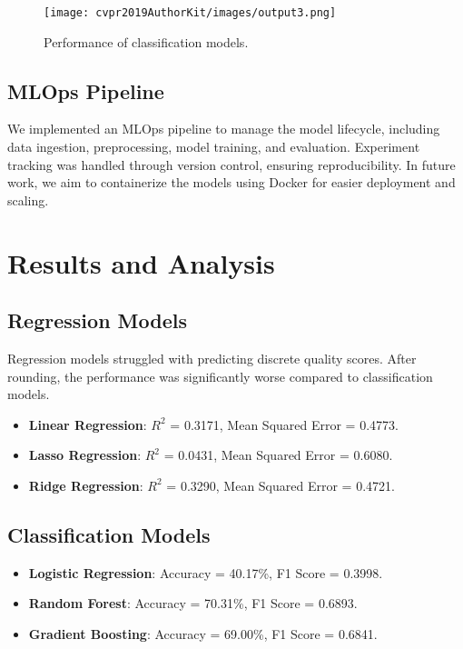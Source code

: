 \documentclass[10pt,twocolumn,letterpaper]{article}
\begin{document}
\begin{figure}[h]
    \centering
    \texttt{[image: cvpr2019AuthorKit/images/output3.png]}
    \caption{Performance of classification models.}
\end{figure}

\subsection{MLOps Pipeline}
We implemented an MLOps pipeline to manage the model lifecycle, including data ingestion, preprocessing, model training, and evaluation. Experiment tracking was handled through version control, ensuring reproducibility. In future work, we aim to containerize the models using Docker for easier deployment and scaling.

\section{Results and Analysis}

\subsection{Regression Models}
Regression models struggled with predicting discrete quality scores. After rounding, the performance was significantly worse compared to classification models.
\begin{itemize}
    \item \textbf{Linear Regression}: $R^2$ = 0.3171, Mean Squared Error = 0.4773.
    \item \textbf{Lasso Regression}: $R^2$ = 0.0431, Mean Squared Error = 0.6080.
    \item \textbf{Ridge Regression}: $R^2$ = 0.3290, Mean Squared Error = 0.4721.
\end{itemize}

\subsection{Classification Models}
\begin{itemize}
    \item \textbf{Logistic Regression}: Accuracy = 40.17\%, F1 Score = 0.3998.
    \item \textbf{Random Forest}: Accuracy = 70.31\%, F1 Score = 0.6893.
    \item \textbf{Gradient Boosting}: Accuracy = 69.00\%, F1 Score = 0.6841.
\end{itemize}
\end{document}
